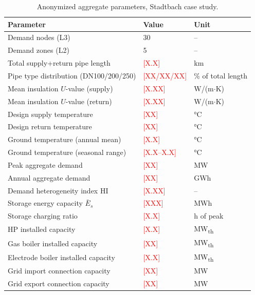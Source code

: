\documentclass[review,3p]{elsarticle}
\newcommand{\placeholder}[1]{\textcolor{red}{[#1]}}
\begin{document}
\begin{table}[htbp]
\centering
\caption{Anonymized aggregate parameters, Stadtbach case study.}
\label{tab:app_params}
\begin{tabular}{@{}lll@{}}
\toprule
Parameter & Value & Unit \\
\midrule
Demand nodes (L3)                      & 30                        & -- \\
Demand zones (L2)                      & 5                         & -- \\
Total supply+return pipe length        & \placeholder{X.X}         & km \\
Pipe type distribution (DN100/200/250) & \placeholder{XX/XX/XX}    & \% of total length \\
Mean insulation $U$-value (supply)     & \placeholder{X.XX}        & W/(m$\cdot$K) \\
Mean insulation $U$-value (return)     & \placeholder{X.XX}        & W/(m$\cdot$K) \\
Design supply temperature              & \placeholder{XX}          & \si{\celsius} \\
Design return temperature              & \placeholder{XX}          & \si{\celsius} \\
Ground temperature (annual mean)       & \placeholder{X.X}         & \si{\celsius} \\
Ground temperature (seasonal range)   & \placeholder{X.X--X.X}    & \si{\celsius} \\
Peak aggregate demand                  & \placeholder{XX}          & MW \\
Annual aggregate demand                & \placeholder{XX}          & GWh \\
Demand heterogeneity index HI          & \placeholder{X.XX}        & -- \\
Storage energy capacity $\bar{E}_s$    & \placeholder{XXX}         & MWh \\
Storage charging ratio                 & \placeholder{X.X}         & h of peak \\
HP installed capacity                  & \placeholder{X.X}         & MW\textsubscript{th} \\
Gas boiler installed capacity          & \placeholder{XX}          & MW\textsubscript{th} \\
Electrode boiler installed capacity    & \placeholder{X.X}         & MW\textsubscript{th} \\
Grid import connection capacity        & \placeholder{XX}          & MW \\
Grid export connection capacity        & \placeholder{XX}          & MW \\
\bottomrule
\end{tabular}
\end{table}
\end{document}
